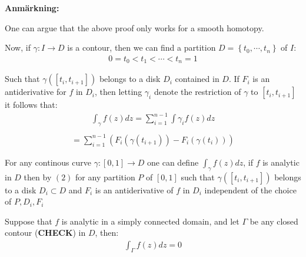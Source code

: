 \par\bigskip
\noindent\textbf{Anmärkning:}\par
\noindent One can argue that the above proof only works for a smooth homotopy.\par
\noindent Now, if $\gamma: I\to D$ is a contour, then we can find a partition $D = \left\{t_0,\cdots, t_n\right\}$ of $I$:
\begin{equation*}
  \begin{gathered}
    0 = t_0<t_1<\cdots<t_n = 1
  \end{gathered}
\end{equation*}\par
\noindent Such that $\gamma([t_i, t_{i+1}])$ belongs to a disk $D_i$ contained in $D$. If $F_i$ is an antiderivative for $f$ in $D_i$, then letting $\gamma_i$ denote the restriction of $\gamma$  to $[t_i,t_{i+1}]$ it follows that:
\begin{equation*}
  \begin{gathered}
    \int_{\gamma}f(z)dz = \sum_{i=1}^{n-1}\int{\gamma_i}f(z)dz\\
  \end{gathered}
\end{equation*}
\begin{equation}
  \begin{gathered}
    = \sum_{i=1}^{n-1}\left(F_i(\gamma(t_{i+1}))-F_i(\gamma(t_i))\right)
  \end{gathered}
\end{equation}
\par\bigskip
\noindent For any continous curve $\gamma:[0,1]\to D$ one can define $\int_{\gamma}f(z)dz$, if $f$ is analytic in $D$ then by $(2)$ for any partition $P$ of $[0,1]$ such that $\gamma([t_i, t_{i+1}])$ belongs to a disk $D_i\subset D$ and $F_i$ is an antiderivative of $f$ in $D_i$ independent of the choice of $P, D_i, F_i$
\par\bigskip
\begin{theo}[Corollary]{}
  Suppose that $f$ is analytic in a simply connected domain, and let $\Gamma$ be any closed contour (\textbf{CHECK}) in $D$, then:
  \begin{equation*}
    \begin{gathered}
      \int_{\Gamma}f(z)dz = 0
    \end{gathered}
  \end{equation*}
\end{theo}
